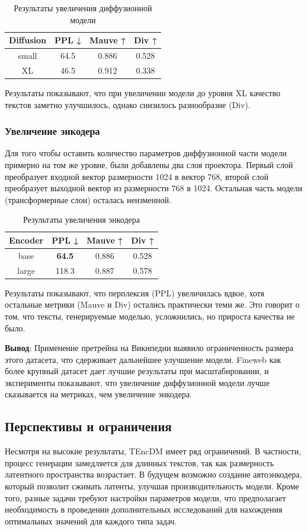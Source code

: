 \documentclass[a4paper, 12pt]{article}
\begin{document}
\begin{table}[h!]
\caption{Результаты увеличения диффузионной модели}
\centering
\begin{tabular}{|c|c|c|c|}
\hline
\textbf{Diffusion} & PPL ↓ & Mauve ↑ & Div ↑ \\ \hline
small & 64.5 & 0.886 & 0.528 \\ \hline
XL & 46.5 & 0.912 & 0.338 \\ \hline
\end{tabular}
\end{table}

Результаты показывают, что при увеличении модели до уровня XL качество текстов заметно улучшилось, однако снизилось разнообразие (Div).

\subsubsection{Увеличение энкодера}
Для того чтобы оставить количество параметров диффузионной части модели примерно на том же уровне, были добавлены два слоя проектора. Первый слой преобразует входной вектор размерности 1024 в вектор 768, второй слой преобразует выходной вектор из размерности 768 в 1024. Остальная часть модели (трансформерные слои) осталась неизменной.

\begin{table}[h!]
\caption{Результаты увеличения энкодера}
\centering
\begin{tabular}{|c|c|c|c|}
\hline
\textbf{Encoder} & PPL ↓ & Mauve ↑ & Div ↑ \\ \hline
base & \textbf{64.5} & 0.886 & 0.528 \\ \hline
large & 118.3 & 0.887 & 0.578 \\ \hline
\end{tabular}
\end{table}

Результаты показывают, что перплексия (PPL) увеличилась вдвое, хотя остальные метрики (Mauve и Div) остались практически теми же. Это говорит о том, что тексты, генерируемые моделью, усложнились, но прироста качества не было.

\textbf{Вывод}: Применение претрейна на Википедии выявило ограниченность размера этого датасета, что сдерживает дальнейшее улучшение модели. Fineweb как более крупный датасет дает лучшие результаты при масштабировании, и эксперименты показывают, что увеличение диффузионной модели лучше сказывается на метриках, чем увеличение энкодера.


\subsection{Перспективы и ограничения}
Несмотря на высокие результаты, TEncDM имеет ряд ограничений. В частности, процесс генерации замедляется для длинных текстов, так как размерность латентного пространства возрастает. В будущем возможно создание автоэнкодера, который позволит сжимать латенты, улучшая производительность модели. Кроме того, разные задачи требуют настройки параметров модели, что предполагает необходимость в проведении дополнительных исследований для нахождения оптимальных значений для каждого типа задач.
\end{document}
